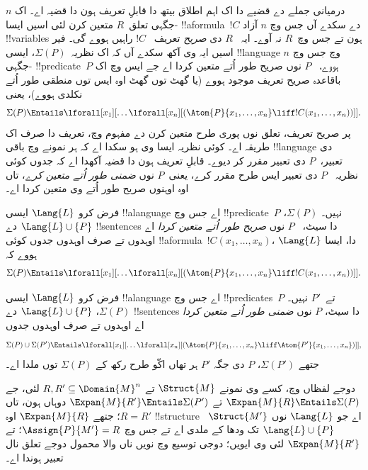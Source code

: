 \documentclass[../../../include/open-logic-section]{subfiles}
\begin{document}


درمیانی جملے دے قضیے دا اک اہم اطلاق
بیتھ دا قابلِ تعریف ہون دا قضیہ اے۔
اک $n$-جگہی تعلق~$R$ متعین کرن لئی
اسیں ایسا !!a{formula}~$!C$ دے سکدے
آں جس وچ $n$ آزاد !!{variable}s ہون
تے جس وچ~$R$ نہ آوے۔ ایہ
~$R$ دی \emph{صریح} تعریف
~$!C$ راہیں ہووے گی۔ فیر اسیں ایہ وی آکھ
سکدے آں کہ اک نظریہ~$\Sigma(P)$،
ایسی !!{language} وچ جس وچ
$n$-جگہی !!{predicate}~$P$ ہووے،
~$P$ نوں صریح طور اُتے متعین کردا
اے جے ایس وچ اک باقاعدہ صریح تعریف
موجود ہووے (یا گھٹ توں گھٹ اوہ
ایس توں منطقی طور اُتے نکلدی ہووے)،
یعنی
\[
\Sigma(P) \Entails \lforall[x_1][\dots
  \lforall[x_n][(\Atom{P}{x_1,\dots, x_n} \liff !C(x_1, \dots,
    x_n))]].
\]
پر صریح تعریف، تعلق نوں پوری طرح
متعین کرن دے مفہوم وچ، تعریف دا صرف
اک طریقہ اے۔ کوئی نظریہ ایسا وی ہو
سکدا اے کہ ہر نمونے وچ باقی
!!{language} دی تعبیر،~$P$ دی تعبیر
مقرر کر دیوے۔ قابلِ تعریف ہون دا
قضیہ آکھدا اے کہ جدوں کوئی نظریہ
~$P$ دی تعبیر ایس طرح مقرر کرے،
یعنی~$P$ نوں \emph{ضمنی طور اُتے
متعین کرے}، تاں اوہ اوہنوں صریح طور
اُتے وی متعین کردا اے۔

\begin{defn}
فرض کرو $\Lang{L}$ ایسی !!a{language}
اے جس وچ !!{predicate}~$P$ نہیں۔
$\Sigma(P)$، $\Lang{L}
\cup \{P\}$ دے !!{sentence}s دا سیٹ،
~$P$ نوں
\emph{صریح طور اُتے متعین کردا} اے
اوہدوں تے صرف اوہدوں جدوں
کوئی !!a{formula}~$!C(x_1, \dots, x_n)$،
$\Lang{L}$ دا، ایسا ہووے
کہ
\[
\Sigma(P) \Entails \lforall[x_1][\dots
  \lforall[x_n][(\Atom{P}{x_1,\dots, x_n} \liff !C(x_1, \dots,
    x_n))]].
\]
\end{defn}

\begin{defn}
فرض کرو $\Lang{L}$ ایسی !!a{language}
اے جس وچ !!{predicate}s~$P$ تے~$P'$
نہیں۔ $\Sigma(P)$،
$\Lang{L} \cup \{P\}$ دے
!!{sentence}s دا سیٹ،
$P$ نوں \emph{ضمنی طور اُتے
متعین کردا} اے اوہدوں تے صرف
اوہدوں جدوں
\[
\Sigma(P) \cup \Sigma(P') \Entails \lforall[x_1][\dots
  \lforall[x_n][(\Atom{P}{x_1,\dots, x_n} \liff \Atom{P'}{x_1,\dots,
      x_n})]],
\]
جتھے $\Sigma(P')$، $P$ دی جگہ
$P'$ ہر تھاں اکّو طرح رکھ کے
$\Sigma(P)$ توں ملدا اے۔
\end{defn}

دوجے لفظاں وچ، کسے وی نمونے
$\Struct{M}$ تے $R, R' \subseteq
\Domain{M}^n$ لئی، جے
$\Expan{M}{R} \Entails \Sigma(P)$
تے $\Expan{M}{R'} \Entails \Sigma(P')$
دوہاں ہون، تاں $R=R'$؛ جتھے
$\Expan{M}{R}$ اوہ !!{structure}
~$\Struct{M'}$ اے جو
$\Lang{L}$ نوں
$\Lang{L} \cup \{P\}$ تک ودھا کے
ملدی اے تے جس وچ
$\Assign{P}{M'} = R$؛ تے
$\Expan{M}{R'}$ لئی وی ایویں؛ دوجی توسیع وچ
نویں ناں والا محمول دوجے تعلق نال تعبیر ہوندا اے۔
\end{document}
